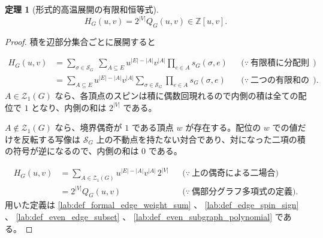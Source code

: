 \documentclass[11pt,a4paper]{article}
\newtheorem{theorem}[definition]{定理}
\theoremstyle{remark}
\begin{document}
\begin{theorem}[形式的高温展開の有限和恒等式]\label{lab:theorem_formal_high_temperature_expansion}
\[H_G(u,v)=2^{|V|}Q_G(u,v)\in\mathbb Z[u,v].\]
\end{theorem}
\begin{proof}
積を辺部分集合ごとに展開すると

\[\begin{aligned}
H_G(u,v)
&=\sum_{\sigma\in\mathcal S_G}\ \sum_{A\subseteq E}u^{|E|-|A|}v^{|A|}\prod_{e\in A}s_G(\sigma,e)
&&\bigl(\because\ \text{有限積に分配則を適用}\bigr)\\
&=\sum_{A\subseteq E}u^{|E|-|A|}v^{|A|}\sum_{\sigma\in\mathcal S_G}\prod_{e\in A}s_G(\sigma,e)
&&\bigl(\because\ \text{二つの有限和の順序交換}\bigr).
\end{aligned}\]
$A\in\mathcal Z_1(G)$
 なら、各頂点のスピンは積に偶数回現れるので内側の積は全ての配位で 
$1$
 となり、内側の和は 
$2^{|V|}$
 である。

$A\notin\mathcal Z_1(G)$
 なら、境界偶奇が 
$1$
 である頂点 
$w$
 が存在する。配位の 
$w$
 での値だけを反転する写像は 
$\mathcal S_G$
 上の不動点を持たない対合であり、対になった二項の積の符号が逆になるので、内側の和は 
$0$
 である。

\[\begin{aligned}
H_G(u,v)
&=\sum_{A\in\mathcal Z_1(G)}u^{|E|-|A|}v^{|A|}\,2^{|V|}
&&\bigl(\because\ \text{上の偶奇による二場合}\bigr)\\
&=2^{|V|}Q_G(u,v)
&&\bigl(\because\ \text{偶部分グラフ多項式の定義}\bigr).
\end{aligned}\]
用いた定義は 
\cref{lab:def_formal_edge_weight_sum}
、
\cref{lab:def_edge_spin_sign}
、
\cref{lab:def_even_edge_subset}
、
\cref{lab:def_even_subgraph_polynomial}
 である。

\end{proof}
\end{document}

